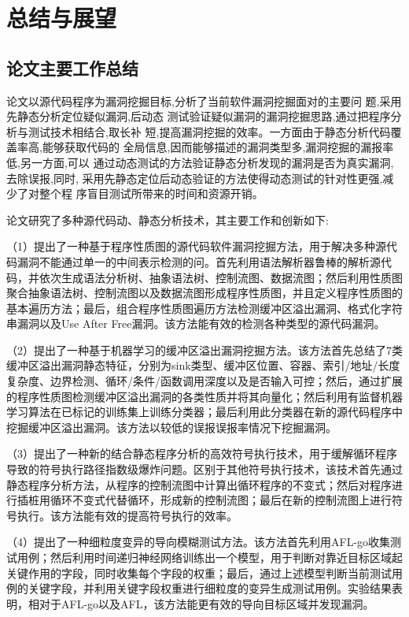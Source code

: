 \chapter{总结与展望}

\section{论文主要工作总结}
论文以源代码程序为漏洞挖掘目标,分析了当前软件漏洞挖掘面对的主要问
题,采用先静态分析定位疑似漏洞,后动态
测试验证疑似漏洞的漏洞挖掘思路,通过把程序分析与测试技术相结合,取长补
短,提高漏洞挖掘的效率。一方面由于静态分析代码覆盖率高,能够获取代码的
全局信息,因而能够描述的漏洞类型多,漏洞挖掘的漏报率低,另一方面,可以
通过动态测试的方法验证静态分析发现的漏洞是否为真实漏洞,去除误报,同时,
采用先静态定位后动态验证的方法使得动态测试的针对性更强,减少了对整个程
序盲目测试所带来的时间和资源开销。

论文研究了多种源代码动、静态分析技术，其主要工作和创新如下:

（1）提出了一种基于程序性质图的源代码软件漏洞挖掘方法，用于解决多种源代码漏洞不能通过单一的中间表示检测的问。首先利用语法解析器鲁棒的解析源代码，并依次生成语法分析树、抽象语法树、控制流图、数据流图；然后利用性质图聚合抽象语法树、控制流图以及数据流图形成程序性质图，并且定义程序性质图的基本遍历方法；最后，组合程序性质图遍历方法检测缓冲区溢出漏洞、格式化字符串漏洞以及Use After Free漏洞。该方法能有效的检测各种类型的源代码漏洞。

（2）提出了一种基于机器学习的缓冲区溢出漏洞挖掘方法。该方法首先总结了7类缓冲区溢出漏洞静态特征，分别为sink类型、缓冲区位置、容器、索引/地址/长度复杂度、边界检测、循环/条件/函数调用深度以及是否输入可控；然后，通过扩展的程序性质图检测缓冲区溢出漏洞的各类性质并将其向量化；然后利用有监督机器学习算法在已标记的训练集上训练分类器；最后利用此分类器在新的源代码程序中挖掘缓冲区溢出漏洞。该方法以较低的误报误报率情况下挖掘漏洞。

（3）提出了一种新的结合静态程序分析的高效符号执行技术，用于缓解循环程序导致的符号执行路径指数级爆炸问题。区别于其他符号执行技术，该技术首先通过静态程序分析方法，从程序的控制流图中计算出循环程序的不变式；然后对程序进行插桩用循环不变式代替循环，形成新的控制流图；最后在新的控制流图上进行符号执行。该方法能有效的提高符号执行的效率。

（4）提出了一种细粒度变异的导向模糊测试方法。该方法首先利用AFL-go收集测试用例；然后利用时间递归神经网络训练出一个模型，用于判断对靠近目标区域起关键作用的字段，同时收集每个字段的权重；最后，通过上述模型判断当前测试用例的关键字段，并利用关键字段权重进行细粒度的变异生成测试用例。实验结果表明，相对于AFL-go以及AFL，该方法能更有效的导向目标区域并发现漏洞。



